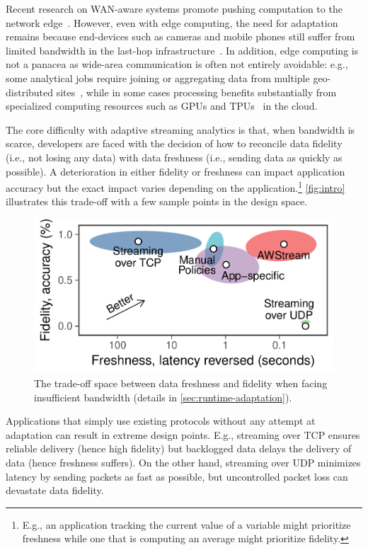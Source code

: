 Recent research on WAN-aware systems promote pushing computation to the network
edge~\cite{rabkin2014aggregation, satyanarayanan2009case}.  However, even with
edge computing, the need for adaptation remains because end-devices such as
cameras and mobile phones still suffer from limited bandwidth in the last-hop
infrastructure~\cite{abari2017enabling, zhang2015design}.  In addition, edge
computing is not a panacea as wide-area communication is often not entirely
avoidable: e.g., some analytical jobs require joining or aggregating data from
multiple geo-distributed sites~\cite{pu2015low, viswanathan2016clarinet}, while
in some cases processing benefits substantially from specialized computing
resources such as GPUs and TPUs~\cite{abadi2016tensorflow} in the cloud.

The core difficulty with adaptive streaming analytics is that, when bandwidth is
scarce, developers are faced with the decision of how to reconcile data fidelity
(i.e., not losing any data) with data freshness (i.e., sending data as quickly
as possible). A deterioration in either fidelity or freshness can impact
application accuracy but the exact impact varies depending on the
application.\footnote{E.g., an application tracking the current value of a
  variable might prioritize freshness while one that is computing an average
  might prioritize fidelity.} \autoref{fig:intro} illustrates this trade-off
with a few sample points in the design space.

\begin{figure}
  \centering
  \includegraphics[width=0.8\columnwidth]{figures/figure1.pdf}
  \caption{The trade-off space between data freshness and fidelity when facing
    insufficient bandwidth (details in \autoref{sec:runtime-adaptation}).}
  \label{fig:intro}
  \vspace{-1em}
\end{figure}

Applications that simply use existing protocols without any attempt at
adaptation can result in extreme design points. E.g., streaming over TCP ensures
reliable delivery (hence high fidelity) but backlogged data delays the delivery
of data (hence freshness suffers).  On the other hand, streaming over UDP
minimizes latency by sending packets as fast as possible, but uncontrolled
packet loss can devastate data fidelity.

